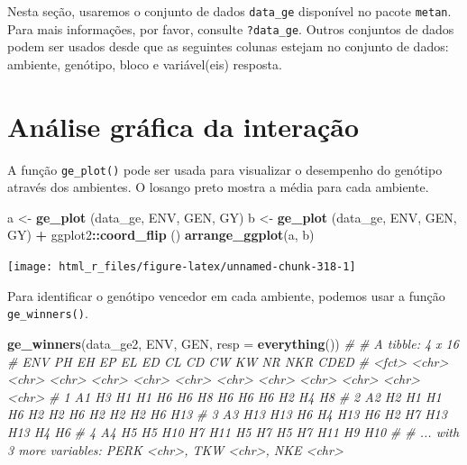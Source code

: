 \documentclass[
]{book}
\newenvironment{Shaded}{\begin{snugshade}}{\end{snugshade}}
\newcommand{\CommentTok}[1]{\textcolor[rgb]{0.56,0.35,0.01}{\textit{#1}}}
\newcommand{\DataTypeTok}[1]{\textcolor[rgb]{0.13,0.29,0.53}{#1}}
\newcommand{\KeywordTok}[1]{\textcolor[rgb]{0.13,0.29,0.53}{\textbf{#1}}}
\newcommand{\NormalTok}[1]{#1}
\newcommand{\OperatorTok}[1]{\textcolor[rgb]{0.81,0.36,0.00}{\textbf{#1}}}
\newcommand{\StringTok}[1]{\textcolor[rgb]{0.31,0.60,0.02}{#1}}
\numberwithin{equation}{section}
\begin{document}
Nesta seção, usaremos o conjunto de dados \texttt{data\_ge} disponível no pacote \texttt{metan}. Para mais informações, por favor, consulte \texttt{?data\_ge}. Outros conjuntos de dados podem ser usados desde que as seguintes colunas estejam no conjunto de dados: ambiente, genótipo, bloco e variável(eis) resposta.

\hypertarget{anuxe1lise-gruxe1fica-da-interauxe7uxe3o}{%
\section{Análise gráfica da interação}\label{anuxe1lise-gruxe1fica-da-interauxe7uxe3o}}

A função \texttt{ge\_plot()} pode ser usada para visualizar o desempenho do genótipo através dos ambientes. O losango preto mostra a média para cada ambiente.

\begin{Shaded}
\begin{Highlighting}[]
\NormalTok{a \textless{}{-}}\StringTok{ }\KeywordTok{ge\_plot}\NormalTok{ (data\_ge, ENV, GEN, GY)}
\NormalTok{b \textless{}{-}}\StringTok{ }\KeywordTok{ge\_plot}\NormalTok{ (data\_ge, ENV, GEN, GY) }\OperatorTok{+}\StringTok{ }\NormalTok{ggplot2}\OperatorTok{::}\KeywordTok{coord\_flip}\NormalTok{ ()}
\KeywordTok{arrange\_ggplot}\NormalTok{(a, b)}
\end{Highlighting}
\end{Shaded}

\begin{center}\texttt{[image: html\_r\_files/figure-latex/unnamed-chunk-318-1]} \end{center}

Para identificar o genótipo vencedor em cada ambiente, podemos usar a função \texttt{ge\_winners()}.

\begin{Shaded}
\begin{Highlighting}[]
\KeywordTok{ge\_winners}\NormalTok{(data\_ge2, ENV, GEN, }\DataTypeTok{resp =} \KeywordTok{everything}\NormalTok{())}
\CommentTok{\# \# A tibble: 4 x 16}
\CommentTok{\#   ENV   PH    EH    EP    EL    ED    CL    CD    CW    KW    NR    NKR   CDED }
\CommentTok{\#   \textless{}fct\textgreater{} \textless{}chr\textgreater{} \textless{}chr\textgreater{} \textless{}chr\textgreater{} \textless{}chr\textgreater{} \textless{}chr\textgreater{} \textless{}chr\textgreater{} \textless{}chr\textgreater{} \textless{}chr\textgreater{} \textless{}chr\textgreater{} \textless{}chr\textgreater{} \textless{}chr\textgreater{} \textless{}chr\textgreater{}}
\CommentTok{\# 1 A1    H3    H1    H1    H6    H6    H8    H6    H6    H6    H2    H4    H8   }
\CommentTok{\# 2 A2    H2    H1    H1    H6    H2    H2    H6    H2    H2    H2    H6    H13  }
\CommentTok{\# 3 A3    H13   H13   H6    H4    H13   H6    H2    H7    H13   H13   H4    H6   }
\CommentTok{\# 4 A4    H5    H5    H10   H7    H11   H5    H7    H5    H7    H11   H9    H10  }
\CommentTok{\# \# ... with 3 more variables: PERK \textless{}chr\textgreater{}, TKW \textless{}chr\textgreater{}, NKE \textless{}chr\textgreater{}}
\end{Highlighting}
\end{Shaded}
\end{document}
